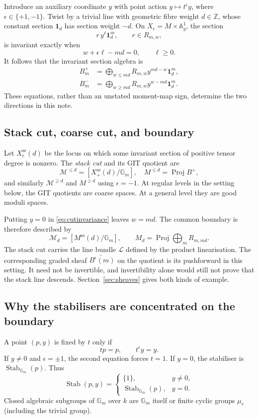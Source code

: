 \documentclass[11pt,a4paper]{article}
\numberwithin{equation}{section}
\theoremstyle{definition}
\newcommand{\A}{\mathbb A}
\newcommand{\Gm}{\mathbb G_m}
\newcommand{\cL}{\mathcal L}
\newcommand{\cM}{\mathcal M}
\newcommand{\Proj}{\operatorname{Proj}}
\newcommand{\Stab}{\operatorname{Stab}}
\newcommand{\sst}{\mathrm{ss}}
\newcommand{\one}{\mathbf 1}
\begin{document}
Introduce an auxiliary coordinate $y$ with point action
$y\mapsto t^\epsilon y$, where $\epsilon\in\{+1,-1\}$. Twist by a trivial
line with geometric fibre weight $d\in\mathbb Z$, whose constant section
$\one_d$ has section weight $-d$. On
$X_\epsilon=M\times\A^1_y$, the section
\[
 r\,y^\ell\one_d^m,\qquad r\in R_{m,w},
\]
is invariant exactly when
\begin{equation}\label{eq:cutinvariance}
 w+\epsilon\ell-md=0,\qquad \ell\ge0.
\end{equation}
It follows that the invariant section algebra is
\begin{align}
 B^+_m&=\bigoplus_{w\le md}R_{m,w}y^{md-w}\one_d^m,\label{eq:cutplus}\\
 B^-_m&=\bigoplus_{w\ge md}R_{m,w}y^{w-md}\one_d^m.\label{eq:cutminus}
\end{align}
These equations, rather than an unstated moment-map sign, determine the
two directions in this note.

\subsection{Stack cut, coarse cut, and boundary}
Let $X^{\sst}_\epsilon(d)$ be the locus on which some invariant section
of positive tensor degree is nonzero. The \emph{stack cut} and its GIT
quotient are
\[
 \cM^{\leq d}=[X^{\sst}_+(d)/\Gm],\quad
 M^{\leq d}=\Proj B^+,
\]
and similarly $\cM^{\geq d}$ and $M^{\geq d}$ using $\epsilon=-1$.
At regular levels in the setting below, the GIT quotients are coarse
spaces. At a general level they are good moduli spaces.

Putting $y=0$ in \eqref{eq:cutinvariance} leaves $w=md$. The common
boundary is therefore described by
\[
 \cM_d=[M^{\sst}(d)/\Gm],\qquad
 M_d=\Proj\bigoplus_mR_{m,md}.
\]
The stack cut carries the line bundle $\cL$ defined by the product
linearisation. The corresponding graded sheaf $\widetilde{B^\epsilon(m)}$
on the quotient is its pushforward in this setting. It need not be
invertible, and invertibility alone would still not prove that the stack
line descends. Section~\ref{sec:sheaves} gives both kinds of example.

\subsection{Why the stabilisers are concentrated on the boundary}
A point $(p,y)$ is fixed by $t$ only if
\[
 tp=p,\qquad t^\epsilon y=y.
\]
If $y\ne0$ and $\epsilon=\pm1$, the second equation forces $t=1$.
If $y=0$, the stabiliser is $\Stab_{\Gm}(p)$. Thus
\begin{equation}\label{eq:cutstabs}
 \Stab(p,y)=
 \begin{cases}
 \{1\},&y\ne0,\\
 \Stab_{\Gm}(p),&y=0.
 \end{cases}
\end{equation}
Closed algebraic subgroups of $\Gm$ over $k$ are $\Gm$ itself or finite
cyclic groups $\mu_r$ (including the trivial group).
\end{document}
